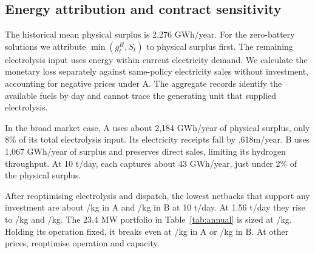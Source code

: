 \subsection{Energy attribution and contract sensitivity}\label{sec:contract1}
The historical mean physical surplus is 2,276 GWh/year.
For the zero-battery solutions we attribute \(\min(g_t^H,S_t)\) to physical
surplus first. The remaining electrolysis input uses energy within current
electricity demand. We calculate the monetary loss separately against
same-policy electricity sales without investment, accounting for negative
prices under A. The aggregate records identify the available fuels by day
and cannot trace the generating unit that supplied electrolysis.

In the broad market case, A uses about 2,184 GWh/year of physical surplus,
only 8\% of its total electrolysis input. Its electricity receipts fall by
,618m/year. B uses 1,067 GWh/year of surplus and preserves direct
sales, limiting its hydrogen throughput. At 10 t/day, each captures
about 43 GWh/year, just under 2\% of the physical surplus.

\newpage
\noindent
After reoptimising electrolysis and dispatch, the lowest netbacks that
support any investment are about /kg in A and /kg in B
at 10 t/day. At 1.56 t/day they rise to /kg and /kg.
The 23.4 MW portfolio in Table~\ref{tab:annual} is sized at /kg.
Holding its operation fixed, it breaks even at /kg in A or
/kg in B. At other prices, reoptimise operation and capacity.


